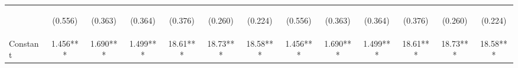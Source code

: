 \documentclass[]{article}
\begin{document}
\begin{center}
\begin{tabular}{lcccccccccccc}
\vspace{4pt} & \begin{footnotesize}(0.556)\end{footnotesize} & \begin{footnotesize}(0.363)\end{footnotesize} & \begin{footnotesize}(0.364)\end{footnotesize} & \begin{footnotesize}(0.376)\end{footnotesize} & \begin{footnotesize}(0.260)\end{footnotesize} & \begin{footnotesize}(0.224)\end{footnotesize} & \begin{footnotesize}(0.556)\end{footnotesize} & \begin{footnotesize}(0.363)\end{footnotesize} & \begin{footnotesize}(0.364)\end{footnotesize} & \begin{footnotesize}(0.376)\end{footnotesize} & \begin{footnotesize}(0.260)\end{footnotesize} & \begin{footnotesize}(0.224)\end{footnotesize} \\
Constant & 1.456*** & 1.690*** & 1.499*** & 18.61*** & 18.73*** & 18.58*** & 1.456*** & 1.690*** & 1.499*** & 18.61*** & 18.73*** & 18.58*** \\

\end{tabular}
\end{center}
\end{document}
